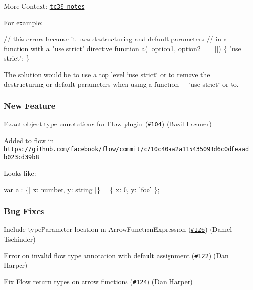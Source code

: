 More Context\+: \href{https://github.com/rwaldron/tc39-notes/blob/master/es7/2015-07/july-29.md#611-the-scope-of-use-strict-with-respect-to-destructuring-in-parameter-lists}{\tt tc39-\/notes}

For example\+:


\begin{DoxyCode}
// this errors because it uses destructuring and default parameters
// in a function with a "use strict" directive
function a([ option1, option2 ] = []) \{
  "use strict";
\}
\end{DoxyCode}


The solution would be to use a top level \char`\"{}use strict\char`\"{} or to remove the destructuring or default parameters when using a function + \char`\"{}use strict\char`\"{} or to.

\subsubsection*{New Feature}


\begin{DoxyItemize}
\item Exact object type annotations for Flow plugin (\href{https://github.com/babel/babylon/pull/104}{\tt \#104}) (Basil Hosmer)
\end{DoxyItemize}

Added to flow in \href{https://github.com/facebook/flow/commit/c710c40aa2a115435098d6c0dfeaadb023cd39b8}{\tt https\+://github.\+com/facebook/flow/commit/c710c40aa2a115435098d6c0dfeaadb023cd39b8}

Looks like\+:


\begin{DoxyCode}
var a : \{| x: number, y: string |\} = \{ x: 0, y: 'foo' \};
\end{DoxyCode}


\subsubsection*{Bug Fixes}


\begin{DoxyItemize}
\item Include {\ttfamily type\+Parameter} location in {\ttfamily Arrow\+Function\+Expression} (\href{https://github.com/babel/babylon/pull/126}{\tt \#126}) (Daniel Tschinder)
\item Error on invalid flow type annotation with default assignment (\href{https://github.com/babel/babylon/pull/122}{\tt \#122}) (Dan Harper)
\item Fix Flow return types on arrow functions (\href{https://github.com/babel/babylon/pull/124}{\tt \#124}) (Dan Harper)
\end{DoxyItemize}

